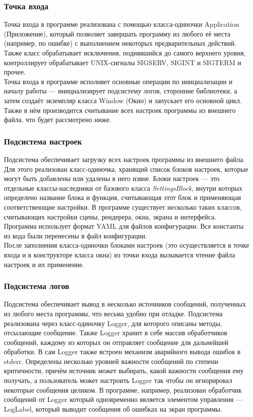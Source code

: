 \documentclass[a4paper,12pt]{report}
\numberwithin{equation}{section}
\begin{document}
\subsubsection{Точка входа}
Точка входа в программе реализована с помощью класса-одиночки Application (Приложение), который позволяет завершать программу из любого её места (например, по ошибке) с выполнением некоторых предварительных действий. Также класс обрабатывает исключения, поднявшийся до самого верхнего уровня, контроллирует обрабатывает UNIX-сигналы SIGSERV, SIGINT и SIGTERM и прочее. \\
Точка входа в программе исполняет основные операции по инициализации и началу работы --- инициализирует подсистему логов, сторонние библиотеки, а затем создаёт экземпляр класса Window (Окно) и запускает его основной цикл. Также в нём производится считывание всех настроек программы из внешнего файла, что будет рассмотрено ниже.

\subsubsection{Подсистема настроек}
Подсистема обеспечивает загрузку всех настроек программы из внешнего файла. Для этого реализован класс-одиночка, хранящий список блоков настроек, которые могут быть добавлены или удалены в него извне. Блоки настроек --- это отдельные классы-наследники от базового класса \textit{SettingsBlock}, внутри которых определено название блока и функция, считывающая этот блок и применяющая соответствеющие настройки. В программе существует несколько таких классов, считывающих настройки сцены, рендерера, окна, экрана и интерфейса. Программа использует формат YAML для файлов конфигурации. Все константы из кода были перенесены в файл конфигурации. \\
После заполнения класса-одиночки блоками настроек (это осуществляется в точке входа и в конструкторе класса окна) из точки входа вызывается чтение файла настроек и их применение.

\subsubsection{Подсистема логов}
Подсистема обеспечивает вывод в несколько источников сообщений, полученных из любого места программы, что весьма удобно при отладке. Подсистема реализована через класс-одиночку Logger, для которого описаны методы, отсылающие сообщение. Также Logger хранит в себе массив обработчиков сообщений, каждому из которых он отправляет сообщение для дальнейшей обработки. В сам Logger также встроен механизм аварийного вывода ошибок в stderr. Определены несколько уровней важности сообщений по степени критичности, причём источник может выбирать, какой важности сообщения ему получать, а пользователь может настроить Logger так чтобы он игнорировал некоторые сообщения целиком. В программе, например, реализован обработчик сообщений от Logger который одновременно является элементом управления --- LogLabel, который выводит сообщения об ошибках на экран программы.
\end{document}
